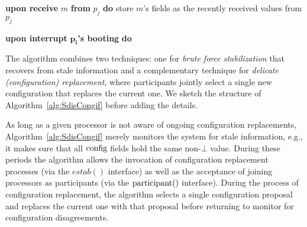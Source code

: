 \documentclass[11pt]{article}
\begin{document}
{\begin{algorithm}[t!]
{{ }

}

{\bf upon receive} $m$ {\bf from} $p_j$ {\bf do}  store $m$'s fields as the recently received values from $p_j$\label{ln:Sreceive}\;

{\bf upon interrupt} $\bm{p_i}${\bf 's booting} {\bf do} 

\end{algorithm}
\setlength{\textfloatsep}{5pt}

The algorithm combines two techniques: one for \emph{brute force stabilization} that recovers from stale information and a complementary technique for \emph{delicate (configuration) replacement}, where participants jointly select a single new configuration that replaces the current one. We sketch the structure of Algorithm~\ref{alg:SdisCongif} before adding the details.  



As long as a given processor is not aware of ongoing configuration replacements, Algorithm~\ref{alg:SdisCongif} merely monitors the system for stale information, e.g., it makes sure that all $\textnormal{config}$ fields hold the same non-$\bot$ value. During these periods the algorithm allows the invocation of configuration replacement processes (via the $estab()$ interface) as well as the acceptance of joining processors as participants (via the $\textnormal{participant}()$ interface). During the process of configuration replacement, the algorithm selects a single configuration proposal and replaces the current one with that proposal before returning to monitor for configuration disagreements.



}
\end{document}
